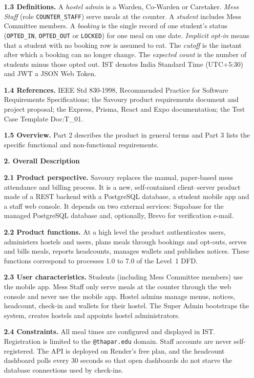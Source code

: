 \documentclass[11pt,a4paper]{article}
\begin{document}
\textbf{1.3 Definitions.} A \emph{hostel admin} is a Warden, Co-Warden or
Caretaker. \emph{Mess Staff} (role \texttt{COUNTER\_STAFF}) serve meals at the
counter. A \emph{student} includes Mess Committee members. A \emph{booking} is
the single record of one student's status (\texttt{OPTED\_IN},
\texttt{OPTED\_OUT} or \texttt{LOCKED}) for one meal on one date. \emph{Implicit
opt-in} means that a student with no booking row is assumed to eat. The
\emph{cutoff} is the instant after which a booking can no longer change. The
\emph{expected count} is the number of students minus those opted out. IST
denotes India Standard Time (UTC+5:30) and JWT a JSON Web Token.

\textbf{1.4 References.} IEEE Std 830-1998, Recommended Practice for Software
Requirements Specifications; the Savoury product requirements document and
project proposal; the Express, Prisma, React and Expo documentation; the Test
Case Template Doc:T\_01.

\textbf{1.5 Overview.} Part 2 describes the product in general terms and Part 3
lists the specific functional and non-functional requirements.

\textbf{2. Overall Description}

\textbf{2.1 Product perspective.} Savoury replaces the manual, paper-based mess
attendance and billing process. It is a new, self-contained client--server
product made of a REST backend with a PostgreSQL database, a student mobile app
and a staff web console. It depends on two external services: Supabase for the
managed PostgreSQL database and, optionally, Brevo for verification e-mail.

\textbf{2.2 Product functions.} At a high level the product authenticates users,
administers hostels and users, plans meals through bookings and opt-outs,
serves and bills meals, reports headcounts, manages wallets and publishes
notices. These functions correspond to processes 1.0 to 7.0 of the Level~1 DFD.

\textbf{2.3 User characteristics.} Students (including Mess Committee members)
use the mobile app. Mess Staff only serve meals at the counter through the web
console and never use the mobile app. Hostel admins manage menus, notices,
headcount, check-in and wallets for their hostel. The Super Admin bootstraps the
system, creates hostels and appoints hostel administrators.

\textbf{2.4 Constraints.} All meal times are configured and displayed in IST.
Registration is limited to the \texttt{@thapar.edu} domain. Staff accounts are
never self-registered. The API is deployed on Render's free plan, and the
headcount dashboard polls every 30 seconds so that open dashboards do not starve
the database connections used by check-ins.
\end{document}
